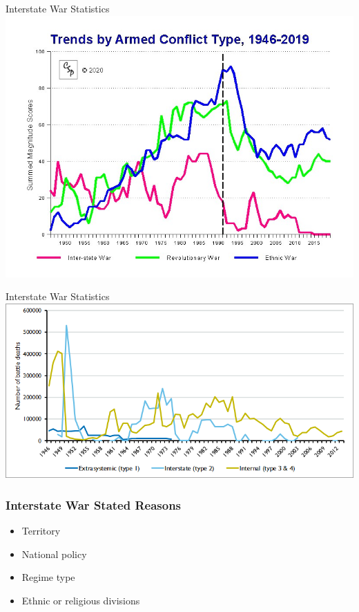 \documentclass[handout]{beamer}
\begin{document}
\begin{frame}{\LARGE Interstate War Statistics} %
	\centering
	\includegraphics[width=\textwidth,height=0.9\textheight,keepaspectratio]{wartyp19.jpg}
\end{frame}

\begin{frame}{\LARGE Interstate War Statistics} %
	\centering
	\includegraphics[width=\textwidth]{battledeathnumbers.png}
\end{frame}

\begin{frame} 
	\frametitle{\LARGE{Interstate War Stated Reasons}}
	\begin{itemize}
		\item Territory \pause
		\item National policy \pause
		\item Regime type \pause
		\item Ethnic or religious divisions 		
	\end{itemize}
\end{frame}
\end{document}
